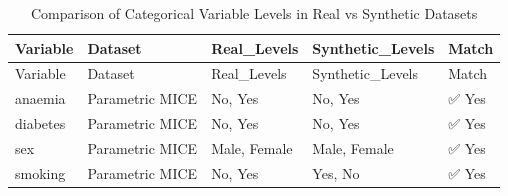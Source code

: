 \documentclass[
  letterpaper,
  DIV=11,
  numbers=noendperiod]{scrartcl}
\begin{document}
\begin{longtable}[]{@{}
  >{\raggedright\arraybackslash}p{}
  >{\raggedright\arraybackslash}p{}
  >{\raggedright\arraybackslash}p{}
  >{\raggedright\arraybackslash}p{}
  >{\raggedright\arraybackslash}p{}@{}}
\caption{Comparison of Categorical Variable Levels in Real vs Synthetic
Datasets}\tabularnewline
\toprule\noalign{}
\begin{minipage}[b]{\linewidth}\raggedright
Variable
\end{minipage} & \begin{minipage}[b]{\linewidth}\raggedright
Dataset
\end{minipage} & \begin{minipage}[b]{\linewidth}\raggedright
Real\_Levels
\end{minipage} & \begin{minipage}[b]{\linewidth}\raggedright
Synthetic\_Levels
\end{minipage} & \begin{minipage}[b]{\linewidth}\raggedright
Match
\end{minipage} \\
\midrule\noalign{}
\endfirsthead
\toprule\noalign{}
\begin{minipage}[b]{\linewidth}\raggedright
Variable
\end{minipage} & \begin{minipage}[b]{\linewidth}\raggedright
Dataset
\end{minipage} & \begin{minipage}[b]{\linewidth}\raggedright
Real\_Levels
\end{minipage} & \begin{minipage}[b]{\linewidth}\raggedright
Synthetic\_Levels
\end{minipage} & \begin{minipage}[b]{\linewidth}\raggedright
Match
\end{minipage} \\
\midrule\noalign{}
\endhead
\bottomrule\noalign{}
\endlastfoot
anaemia & Parametric MICE & No, Yes & No, Yes & ✅ Yes \\
diabetes & Parametric MICE & No, Yes & No, Yes & ✅ Yes \\
sex & Parametric MICE & Male, Female & Male, Female & ✅ Yes \\
smoking & Parametric MICE & No, Yes & Yes, No & ✅ Yes \\

\end{longtable}
\end{document}
